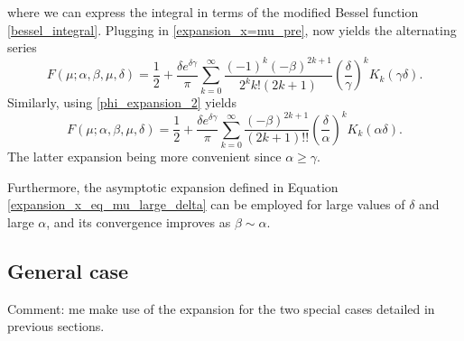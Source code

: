 \documentclass[10pt,a4paper,oneside]{article}
\numberwithin{equation}{section}
\begin{document}
where we can express the integral in terms of the modified Bessel function \eqref{bessel_integral}. Plugging in \eqref{expansion_x=mu_pre}, now yields the alternating series
\begin{equation}\label{series_x=mu_1}
F(\mu; \alpha, \beta, \mu, \delta) = \frac{1}{2} + \frac{\delta e^{\delta \gamma}}{\pi} \sum_{k=0}^{\infty} \frac{(-1)^k (-\beta)^{2k+1}}{2^k k! (2k + 1)} \left(\frac{\delta}{\gamma}\right)^k K_k(\gamma \delta).
\end{equation}
Similarly, using \eqref{phi_expansion_2} yields
\begin{equation}\label{series_x=mu_2}
F(\mu; \alpha, \beta, \mu, \delta) = \frac{1}{2} + \frac{\delta e^{\delta \gamma}}{\pi} \sum_{k=0}^{\infty} \frac{(-\beta)^{2k+1}}{(2k + 1)!!} \left(\frac{\delta}{\alpha}\right)^k K_k(\alpha \delta).
\end{equation}
The latter expansion being more convenient since $\alpha \ge \gamma$.

Furthermore, the asymptotic expansion defined in Equation \eqref{expansion_x_eq_mu_large_delta} can be employed for large values of $\delta$ and large $\alpha$, and its convergence improves as $\beta \sim \alpha$.


\subsection{General case}\label{section_general_case}
Comment: me make use of the expansion for the two special cases detailed in previous sections.
\end{document}

